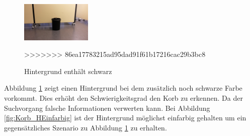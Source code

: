 \begin{figure}[h!]
    \centering
    \includegraphics[width=0.3\textwidth]{fig/korb1.jpg}
    \caption{Hintergrund enthält schwarz}
    \label{fig:Korb_HSchwarz}
>>>>>>> 86ea17783215ad95dad91f61b17216cac29b3bc8
\end{figure}

Abbildung \ref{fig:Korb_HSchwarz} zeigt einen Hintergrund bei dem zusätzlich 
noch schwarze Farbe vorkommt. Dies erhöht den Schwierigkeitsgrad  den Korb zu 
erkennen. Da der Suchvorgang falsche Informationen verwerten kann. Bei 
Abbildung \ref{fig:Korb_HEinfarbig} ist der Hintergrund möglichst einfarbig 
gehalten um ein gegensätzliches Szenario zu Abbildung \ref{fig:Korb_HSchwarz} 
zu erhalten.

